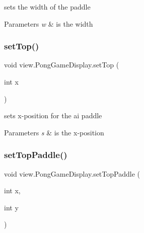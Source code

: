 sets the width of the paddle 


\begin{DoxyParams}{Parameters}
{\em w} & is the width \\
\hline
\end{DoxyParams}
\hypertarget{classview_1_1_pong_game_display_a8b9caa56b471453556b7380ee6d37340}{}\label{classview_1_1_pong_game_display_a8b9caa56b471453556b7380ee6d37340} 
\subsubsection{\texorpdfstring{set\+Top()}{setTop()}}
{\footnotesize\ttfamily void view.\+Pong\+Game\+Display.\+set\+Top (\begin{DoxyParamCaption}\item[{int}]{x }\end{DoxyParamCaption})}



sets x-\/position for the ai paddle 


\begin{DoxyParams}{Parameters}
{\em s} & is the x-\/position \\
\hline
\end{DoxyParams}
\hypertarget{classview_1_1_pong_game_display_a175282d960f6beec7819bd373f09f170}{}\label{classview_1_1_pong_game_display_a175282d960f6beec7819bd373f09f170} 
\subsubsection{\texorpdfstring{set\+Top\+Paddle()}{setTopPaddle()}}
{\footnotesize\ttfamily void view.\+Pong\+Game\+Display.\+set\+Top\+Paddle (\begin{DoxyParamCaption}\item[{int}]{x,  }\item[{int}]{y }\end{DoxyParamCaption})}

\hypertarget{classview_1_1_pong_game_display_a04bcc8b60d85f38178d2cd817e3fbd39}{}\label{classview_1_1_pong_game_display_a04bcc8b60d85f38178d2cd817e3fbd39} 
